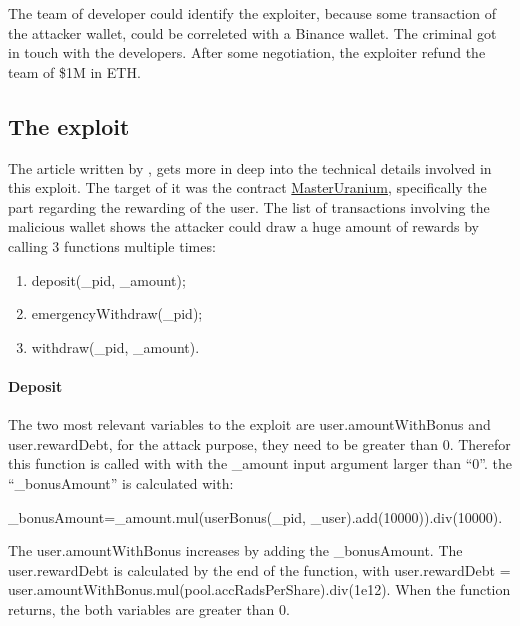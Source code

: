 The team of developer could identify the exploiter, because some transaction of the attacker wallet, could be 
correleted with a Binance wallet. The criminal got in touch with the developers. After some negotiation, 
the exploiter refund the team of \$1M in ETH.

\subsection{The exploit}
\label{sec:Uranium:Exploit}


The article written by \citeauthor{UraniumTech}, gets more in deep into the technical details involved in this exploit.
The target of it was the contract \href{https://bscscan.com/address/0xd5aac41d315c1d382dcf1c39d4ed9b37c224edf2#code}{MasterUranium}, specifically the part regarding the rewarding of the user.
The list of transactions involving the malicious wallet shows the attacker could draw a huge amount of rewards 
by calling 3 functions multiple times:
\begin{enumerate}
    \item deposit(\_pid, \_amount); 
    \item emergencyWithdraw(\_pid); 
    \item withdraw(\_pid, \_amount).
\end{enumerate}


\paragraph{Deposit} The two most relevant variables to the exploit are user.amountWithBonus and user.rewardDebt, for the attack purpose, they need to be greater than 0.
Therefor this function is called with  with the \_amount input argument larger than “0”. 
the “\_bonusAmount” is calculated with:

\_bonusAmount=\_amount.mul(userBonus(\_pid, \_user).add(10000)).div(10000).

The user.amountWithBonus increases by adding  the \_bonusAmount. 
The user.rewardDebt is calculated by the end of the function, with
user.rewardDebt = user.amountWithBonus.mul(pool.accRadsPerShare).div(1e12).
When the function returns, the  both variables are greater than 0.

